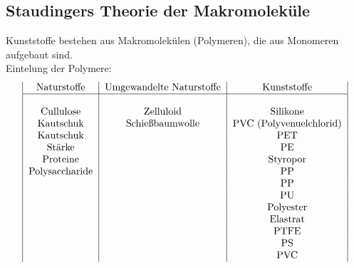 \documentclass[../../main.tex]{subfiles}
\begin{document}
\subsection{Staudingers Theorie der Makromoleküle}
Kunststoffe bestehen aus Makromolekülen (Polymeren), die aus Monomeren aufgebaut sind. \\
Eintelung der Polymere:
\\
\begin{align*}
    \begin{tabular}{|c|c|c|}
        Naturstoffe & Umgewandelte Naturstoffe & Kunststoffe \\
        \hline
         &  & \\
        Cullulose & Zelluloid & Silikone \\
        Kautschuk & Schießbaumwolle & PVC (Polyvenuelchlorid) \\
        Kautschuk &  & PET \\
        Stärke &  & PE \\
        Proteine &  & Styropor\\
        Polysaccharide &  & PP\\
         &  & PP\\
         &  & PU\\
         &  & Polyester\\
         &  & Elastrat\\
         &  & PTFE\\
         &  & PS\\
         &  & PVC
    \end{tabular}
\end{align*}
%
%
\end{document}

